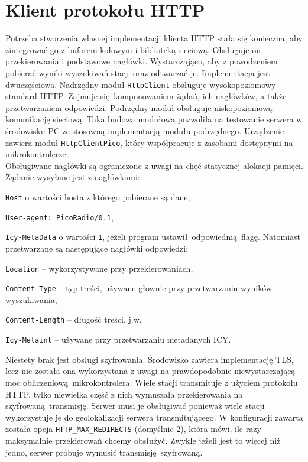 \documentclass[12pt]{report}
\let\tempone\itemize
\let\temptwo\enditemize
\renewenvironment{itemize}{\tempone\setlength{\itemsep}{0cm}}{\temptwo}
\begin{document}
	\section{Klient protokołu HTTP}
		Potrzeba stworzenia własnej implementacji klienta HTTP stała się konieczna, aby zintegrować go z buforem kołowym i biblioteką sieciową. Obsługuje on przekierowania i podstawowe nagłówki. Wystarczająco, aby z powodzeniem pobierać wyniki wyszukiwań stacji oraz odtwarzać je. Implementacja jest dwuczęściowa. Nadrzędny moduł \lstinline|HttpClient| obsługuje wysokopoziomowy standard HTTP. Zajmuje się komponowaniem żądań, ich nagłówków, a także przetwarzaniem odpowiedzi. Podrzędny moduł obsługuje niskopoziomową komunikację sieciową. Taka budowa modułowa pozwoliła na testowanie serwera w środowisku PC ze stosowną implementacją modułu podrzędnego. Urządzenie zawiera moduł \lstinline|HttpClientPico|, który współpracuje z zasobami dostępnymi na mikrokontrolerze.
		$ $\\
		
		Obsługiwane nagłówki są ograniczone z uwagi na chęć statycznej alokacji pamięci. Żądanie wysyłane jest z nagłówkami:
		\begin{itemize}
			\item \lstinline|Host| o wartości hosta z którego pobierane są dane,
			\item \lstinline|User-agent: PicoRadio/0.1|,
			\item \lstinline|Icy-MetaData| o wartości \lstinline|1|, jeżeli program ustawił odpowiednią flagę.
		\end{itemize}
		Natomiast przetwarzane są następujące nagłówki odpowiedzi:
		\begin{itemize}
			\item \lstinline|Location| -- wykorzystywane przy przekierowaniach,
			\item \lstinline|Content-Type| -- typ treści, używane głownie przy przetwarzaniu wyników wyszukiwania,
			\item \lstinline|Content-Length| -- długość treści, j.w.
			\item \lstinline|Icy-Metaint| -- używane przy przetwarzaniu metadanych ICY.
		\end{itemize}
		
		Niestety brak jest obsługi szyfrowania. Środowisko zawiera implementację TLS, lecz nie została ona wykorzystana z uwagi na prawdopodobnie niewystarczającą moc obliczeniową mikrokontrolera. Wiele stacji transmituje z użyciem protokołu HTTP, tylko niewielka część z nich wymuszała przekierowania na szyfrowaną transmisję. Serwer musi je obsługiwać ponieważ wiele stacji wykorzystuje je do geolokalizacji serwera transmitującego. W konfiguracji zawarta została opcja \lstinline|HTTP_MAX_REDIRECTS| (domyślnie 2), która mówi, ile razy maksymalnie przekierowań chcemy obsłużyć. Zwykle jeżeli jest to więcej niż jedno, serwer próbuje wymusić transmisję szyfrowaną.
		
\end{document}
